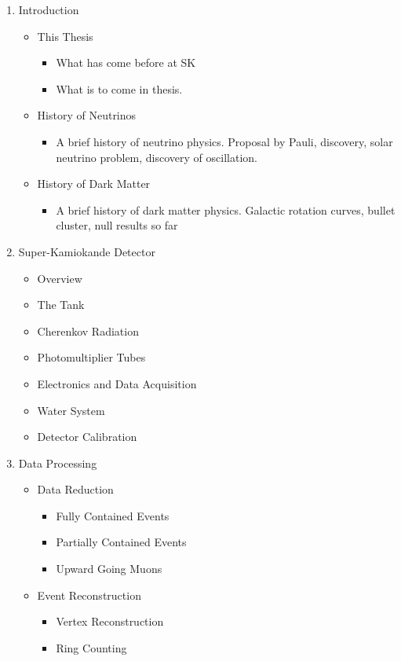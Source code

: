 \documentclass[12pt,oneside,openright]{article}
\begin{document}
\begin{enumerate}
\item Introduction
	\begin{itemize} 
	\item This Thesis
		\begin{itemize}
		\item What has come before at SK
		\item What is to come in thesis.
		\end{itemize}
	\item History of Neutrinos 
		\begin{itemize}
		\item A brief history of neutrino physics.  Proposal by Pauli, discovery, solar neutrino problem, discovery of oscillation. 
		\end{itemize}
	\item History of Dark Matter
		\begin{itemize}
		\item A brief history of dark matter physics.  Galactic rotation curves, bullet cluster, null results so far
		\end{itemize}
	\end{itemize} 
\item Super-Kamiokande Detector
	\begin{itemize}
	\item Overview
	\item The Tank
	\item Cherenkov Radiation
	\item Photomultiplier Tubes
	\item Electronics and Data Acquisition
  	\item Water System
	\item Detector Calibration
	\end{itemize}
\item Data Processing
	\begin{itemize}
	\item Data Reduction
		\begin{itemize}
		\item Fully Contained Events
		\item Partially Contained Events
		\item Upward Going Muons
		\end{itemize}
	\item Event Reconstruction
		\begin{itemize}
		\item Vertex Reconstruction
		\item Ring Counting

\end{itemize}
\end{itemize}
\end{enumerate}
\end{document}
